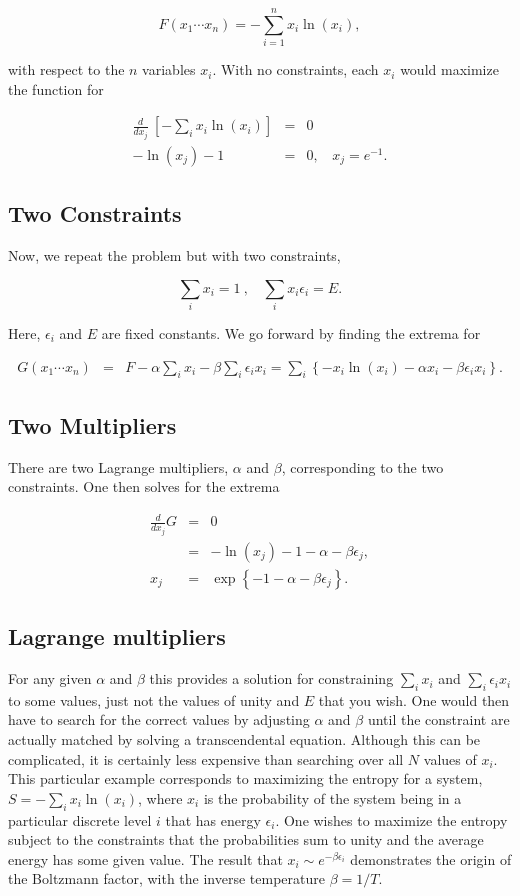 \documentclass[%
oneside,                 %
final,                   %
10pt]{article}
\begin{document}
\[
F(x_1\cdots x_n)=-\sum_{i=1}^n x_i\ln(x_i), 
\]

with respect to the $n$ variables $x_i$. With no constraints, each
$x_i$ would maximize the function for

\begin{eqnarray*}
\frac{d}{dx_j}~\left[-\sum_i x_i\ln(x_i)\right]&=&0\\
-\ln(x_j)-1&=&0,~~~~x_j=e^{-1}.
\end{eqnarray*}

\subsection*{Two Constraints}

Now, we repeat the problem but with two constraints,

\[
\sum_ix_i=1~,~~~~\sum_ix_i\epsilon_i=E.
\]

Here, $\epsilon_i$ and $E$ are fixed constants. We go forward by
finding the extrema for

\begin{eqnarray*}
G(x_1\cdots x_n)&=&F-\alpha\sum_i x_i-\beta\sum_i\epsilon_ix_i
=\sum_i \left\{-x_i\ln(x_i)-\alpha x_i-\beta\epsilon_ix_i\right\}.
\end{eqnarray*}

\subsection*{Two Multipliers}

There are two Lagrange multipliers, $\alpha$ and $\beta$,
corresponding to the two constraints. One then solves for the extrema

\begin{eqnarray*}
\frac{d}{dx_j}G&=&0\\
&=&-\ln(x_j)-1-\alpha-\beta\epsilon_j,\\
x_j&=&\exp\left\{-1-\alpha-\beta\epsilon_j\right\}.
\end{eqnarray*}

\subsection*{Lagrange multipliers}

For any given $\alpha$ and $\beta$ this provides a solution for
constraining $\sum_i x_i$ and $\sum_i\epsilon_ix_i$ to some values,
just not the values of unity and $E$ that you wish. One would then
have to search for the correct values by adjusting $\alpha$ and
$\beta$ until the constraint are actually matched by solving a
transcendental equation. Although this can be complicated, it is
certainly less expensive than searching over all $N$ values of
$x_i$. This particular example corresponds to maximizing the entropy
for a system, $S=-\sum_i x_i\ln(x_i)$, where $x_i$ is the probability
of the system being in a particular discrete level $i$ that has energy
$\epsilon_i$. One wishes to maximize the entropy subject to the
constraints that the probabilities sum to unity and the average energy
has some given value. The result that $x_i\sim e^{-\beta\epsilon_i}$
demonstrates the origin of the Boltzmann factor, with the inverse
temperature $\beta=1/T$.
\end{document}

